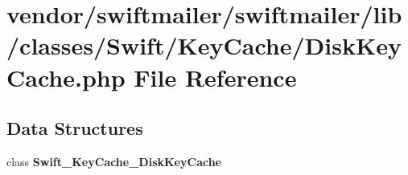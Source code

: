 \section{vendor/swiftmailer/swiftmailer/lib/classes/\+Swift/\+Key\+Cache/\+Disk\+Key\+Cache.php File Reference}
\label{_disk_key_cache_8php}
\subsection*{Data Structures}
\begin{DoxyCompactItemize}
\item 
class {\bf Swift\+\_\+\+Key\+Cache\+\_\+\+Disk\+Key\+Cache}
\end{DoxyCompactItemize}
